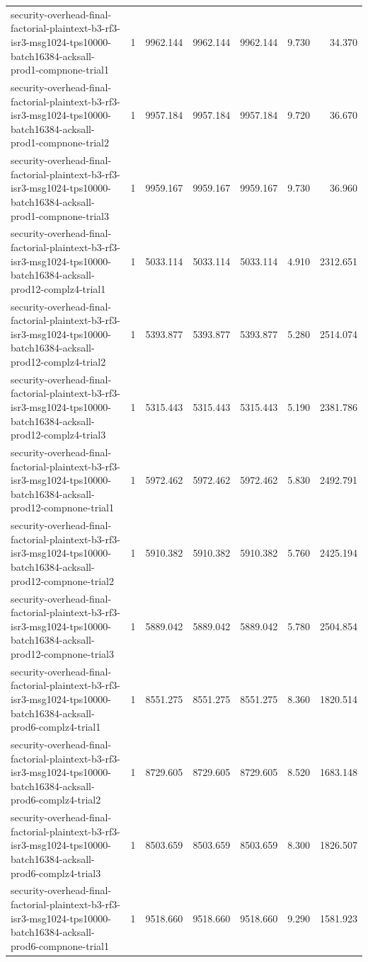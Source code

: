 \begin{tabular}{lrrrrrr}
security-overhead-final-factorial-plaintext-b3-rf3-isr3-msg1024-tps10000-batch16384-acksall-prod1-compnone-trial1 & 1 & 9962.144 & 9962.144 & 9962.144 & 9.730 & 34.370 \\
security-overhead-final-factorial-plaintext-b3-rf3-isr3-msg1024-tps10000-batch16384-acksall-prod1-compnone-trial2 & 1 & 9957.184 & 9957.184 & 9957.184 & 9.720 & 36.670 \\
security-overhead-final-factorial-plaintext-b3-rf3-isr3-msg1024-tps10000-batch16384-acksall-prod1-compnone-trial3 & 1 & 9959.167 & 9959.167 & 9959.167 & 9.730 & 36.960 \\
security-overhead-final-factorial-plaintext-b3-rf3-isr3-msg1024-tps10000-batch16384-acksall-prod12-complz4-trial1 & 1 & 5033.114 & 5033.114 & 5033.114 & 4.910 & 2312.651 \\
security-overhead-final-factorial-plaintext-b3-rf3-isr3-msg1024-tps10000-batch16384-acksall-prod12-complz4-trial2 & 1 & 5393.877 & 5393.877 & 5393.877 & 5.280 & 2514.074 \\
security-overhead-final-factorial-plaintext-b3-rf3-isr3-msg1024-tps10000-batch16384-acksall-prod12-complz4-trial3 & 1 & 5315.443 & 5315.443 & 5315.443 & 5.190 & 2381.786 \\
security-overhead-final-factorial-plaintext-b3-rf3-isr3-msg1024-tps10000-batch16384-acksall-prod12-compnone-trial1 & 1 & 5972.462 & 5972.462 & 5972.462 & 5.830 & 2492.791 \\
security-overhead-final-factorial-plaintext-b3-rf3-isr3-msg1024-tps10000-batch16384-acksall-prod12-compnone-trial2 & 1 & 5910.382 & 5910.382 & 5910.382 & 5.760 & 2425.194 \\
security-overhead-final-factorial-plaintext-b3-rf3-isr3-msg1024-tps10000-batch16384-acksall-prod12-compnone-trial3 & 1 & 5889.042 & 5889.042 & 5889.042 & 5.780 & 2504.854 \\
security-overhead-final-factorial-plaintext-b3-rf3-isr3-msg1024-tps10000-batch16384-acksall-prod6-complz4-trial1 & 1 & 8551.275 & 8551.275 & 8551.275 & 8.360 & 1820.514 \\
security-overhead-final-factorial-plaintext-b3-rf3-isr3-msg1024-tps10000-batch16384-acksall-prod6-complz4-trial2 & 1 & 8729.605 & 8729.605 & 8729.605 & 8.520 & 1683.148 \\
security-overhead-final-factorial-plaintext-b3-rf3-isr3-msg1024-tps10000-batch16384-acksall-prod6-complz4-trial3 & 1 & 8503.659 & 8503.659 & 8503.659 & 8.300 & 1826.507 \\
security-overhead-final-factorial-plaintext-b3-rf3-isr3-msg1024-tps10000-batch16384-acksall-prod6-compnone-trial1 & 1 & 9518.660 & 9518.660 & 9518.660 & 9.290 & 1581.923 \\

\end{tabular}
